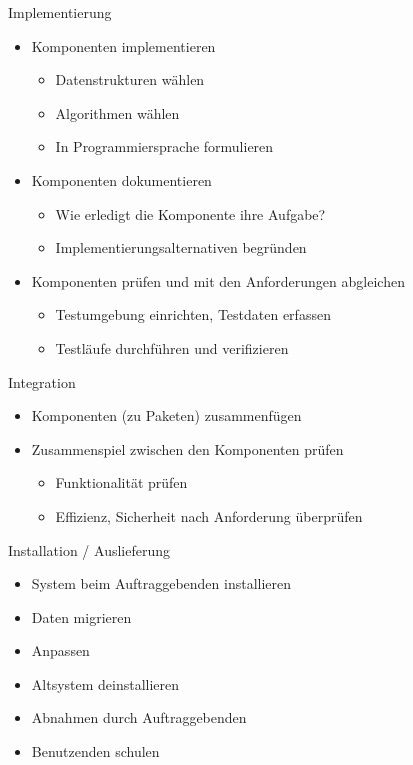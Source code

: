 \begin{bonus}{Implementierung}
    \begin{itemize}
        \item Komponenten implementieren
              \begin{itemize}
                  \item Datenstrukturen wählen
                  \item Algorithmen wählen
                  \item In Programmiersprache formulieren
              \end{itemize}
        \item Komponenten dokumentieren
              \begin{itemize}
                  \item Wie erledigt die Komponente ihre Aufgabe?
                  \item Implementierungsalternativen begründen
              \end{itemize}
        \item Komponenten prüfen und mit den Anforderungen abgleichen
              \begin{itemize}
                  \item Testumgebung einrichten, Testdaten erfassen
                  \item Testläufe durchführen und verifizieren
              \end{itemize}
    \end{itemize}
\end{bonus}

\begin{bonus}{Integration}
    \begin{itemize}
        \item Komponenten (zu Paketen) zusammenfügen
        \item Zusammenspiel zwischen den Komponenten prüfen
              \begin{itemize}
                  \item Funktionalität prüfen
                  \item Effizienz, Sicherheit nach Anforderung überprüfen
              \end{itemize}
    \end{itemize}
\end{bonus}

\begin{bonus}{Installation / Auslieferung}
    \begin{itemize}
        \item System beim Auftraggebenden installieren
        \item Daten migrieren
        \item Anpassen
        \item Altsystem deinstallieren
        \item Abnahmen durch Auftraggebenden
        \item Benutzenden schulen
    \end{itemize}
\end{bonus}

